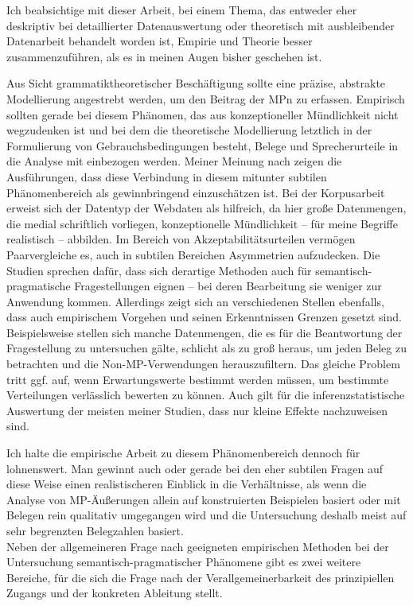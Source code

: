 \newpage\noindent
Ich beabsichtige mit dieser Arbeit, bei einem Thema, das entweder eher deskriptiv bei detaillierter Datenauswertung oder theoretisch mit ausbleibender Datenarbeit behandelt worden ist, Empirie und Theorie besser zusammenzuführen, als es in meinen Augen bisher geschehen ist. 

Aus Sicht grammatiktheoretischer Beschäftigung sollte eine präzise, abstrakte Modellierung angestrebt werden, um den Beitrag der MPn zu erfassen. Empirisch sollten gerade bei diesem Phänomen, das aus konzeptioneller Mündlichkeit nicht wegzudenken ist und bei dem die theoretische Modellierung letztlich in der Formulierung von Gebrauchsbedingungen besteht, Belege und Sprecherurteile in die Analyse mit einbezogen werden. Meiner Meinung nach zeigen die Ausführungen, dass diese Verbindung in diesem mitunter subtilen Phänomenbereich als gewinnbringend einzuschätzen ist. Bei der Korpusarbeit erweist sich der Datentyp der Webdaten als hilfreich, da hier große Datenmengen, die medial schriftlich vorliegen, konzeptionelle Mündlichkeit – für meine Begriffe realistisch – abbilden. Im Bereich von Akzeptabilitätsurteilen vermögen Paarvergleiche es, auch in subtilen Bereichen Asymmetrien aufzudecken. Die Studien sprechen dafür, dass sich derartige Methoden auch für semantisch-pragmatische Fragestellungen eignen – bei deren Bearbeitung sie weniger zur Anwendung kommen. Allerdings zeigt sich an verschiedenen Stellen ebenfalls, dass auch empirischem Vorgehen und seinen Erkenntnissen Grenzen gesetzt sind. Beispielsweise stellen sich manche Datenmengen, die es für die Beantwortung der Frage\-stellung zu untersuchen gälte, schlicht als zu groß heraus, um jeden Beleg zu betrachten und die Non-MP-Verwendungen herauszufiltern. Das gleiche Problem tritt ggf. auf, wenn Erwartungswerte bestimmt werden müssen, um bestimmte Verteilungen verlässlich bewerten zu können. Auch gilt für die inferenzstatistische Auswertung der meisten meiner Studien, dass nur kleine Effekte nachzuweisen sind.

Ich halte die empirische Arbeit zu diesem Phänomenbereich dennoch für loh\-nenswert. Man gewinnt auch oder gerade bei den eher subtilen Fragen auf diese Weise einen realistischeren Einblick in die Verhältnisse, als wenn die Analyse von MP-Äußerungen allein auf konstruierten Beispielen basiert oder mit Belegen rein qualitativ umgegangen wird und die Untersuchung deshalb meist auf sehr begrenzten Belegzahlen basiert.\\

\noindent
Neben der allgemeineren Frage nach geeigneten empirischen Methoden bei der Untersuchung semantisch-pragmatischer Phänomene gibt es zwei weitere Berei\-che, für die sich die Frage nach der Verallgemeinerbarkeit des prinzipiellen Zugangs und der konkreten Ableitung stellt.

